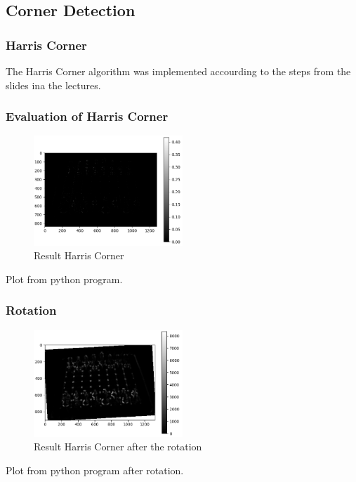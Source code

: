 \documentclass[12pt]{article}
\begin{document}
\newpage
\subsection{Corner Detection}

\subsubsection{Harris Corner}
The Harris Corner algorithm was implemented accourding to the steps from the slides ina
the lectures.
\subsubsection{Evaluation of Harris Corner}
\begin{figure}[!htb]
  \centering
  \includegraphics[width=0.5\textwidth]{pics/3_2_s}
  \caption{Result Harris Corner}
\end{figure}
Plot from python program.

\subsubsection{Rotation}
\begin{figure}[!htb]
  \centering
  \includegraphics[width=0.5\textwidth]{pics/3_3_s}
  \caption{Result Harris Corner after the rotation}
\end{figure}
Plot from python program after rotation.

\newpage
\end{document}
